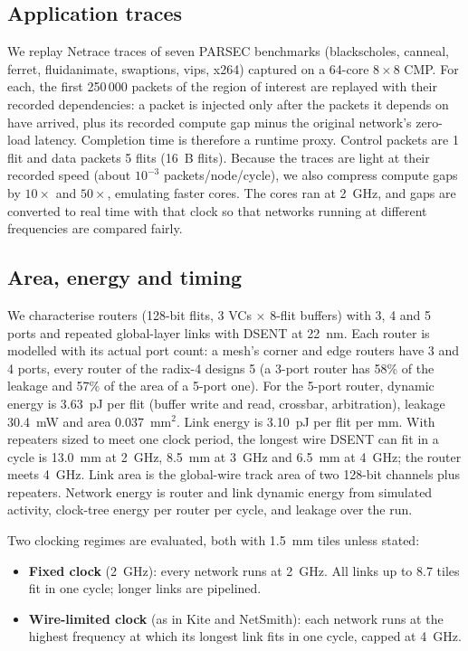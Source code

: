 \documentclass[preprint,12pt,a4paper]{elsarticle}
\begin{document}
\subsection{Application traces}
We replay Netrace traces \cite{netrace} of seven PARSEC benchmarks
\cite{bienia2008parsec} (blackscholes, canneal, ferret, fluidanimate,
swaptions, vips, x264) captured on a 64-core $8\times8$ CMP. For each, the
first 250\,000 packets of the region of interest are replayed with their
recorded dependencies: a packet is injected only after the packets it
depends on have arrived, plus its recorded compute gap minus the original
network's zero-load latency. Completion time is therefore a runtime proxy.
Control packets are 1 flit and data packets 5 flits (16~B flits). Because
the traces are light at their recorded speed (about $10^{-3}$
packets/node/cycle), we also compress compute gaps by $10\times$ and
$50\times$, emulating faster cores. The cores ran at 2~GHz, and gaps are
converted to real time with that clock so that networks running at
different frequencies are compared fairly.

\subsection{Area, energy and timing}
\label{sec:power}
We characterise routers (128-bit flits, 3 VCs $\times$ 8-flit buffers)
with 3, 4 and 5 ports and repeated global-layer links with DSENT
\cite{dsent} at 22~nm. Each router is modelled with its actual port count:
a mesh's corner and edge routers have 3 and 4 ports, every router of the
radix-4 designs 5 (a 3-port router has 58\% of the leakage and 57\% of the
area of a 5-port one).
For the 5-port router, dynamic energy is 3.63~pJ per flit (buffer write
and read, crossbar, arbitration), leakage 30.4~mW and area 0.037~mm$^2$. Link
energy is 3.10~pJ per flit per mm. With repeaters sized to meet one clock
period, the longest wire DSENT can fit in a cycle is 13.0~mm at 2~GHz,
8.5~mm at 3~GHz and 6.5~mm at 4~GHz; the router meets 4~GHz. Link area is
the global-wire track area of two 128-bit channels plus repeaters. Network
energy is router and link dynamic energy from simulated activity, clock-tree
energy per router per cycle, and leakage over the run.

Two clocking regimes are evaluated, both with 1.5~mm tiles unless stated:
\begin{itemize}
  \item \textbf{Fixed clock} (2~GHz): every network runs at 2~GHz. All links
        up to 8.7 tiles fit in one cycle; longer links are pipelined.
  \item \textbf{Wire-limited clock} (as in Kite and NetSmith): each network
        runs at the highest frequency at which its longest link fits in one
        cycle, capped at 4~GHz.
\end{itemize}
\end{document}
